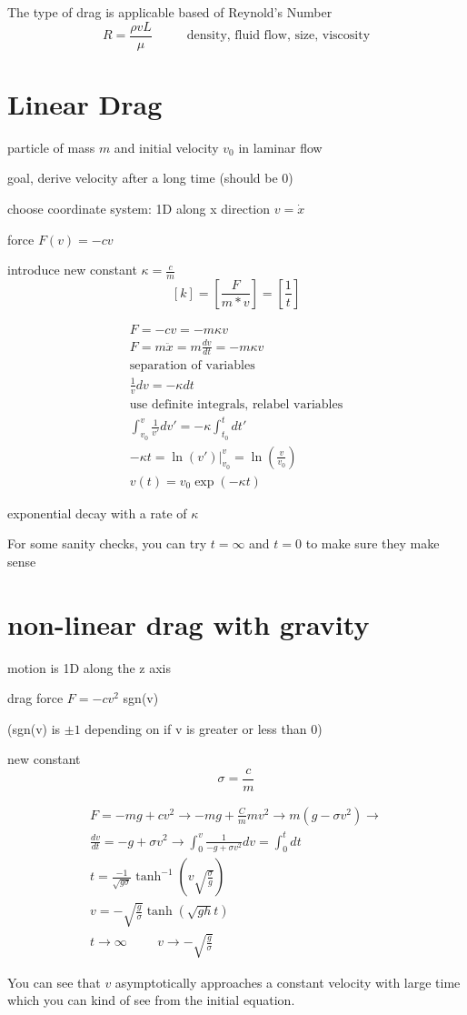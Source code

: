 \documentclass[fleqn]{report}
\newcommand{\hp}{\hspace{1cm}}
\newcommand{\equations} [1] {
\begin{gather*}
#1
\end{gather*}
}
\begin{document}
The type of drag is applicable based of Reynold's Number
\[
R = \frac{\rho v L}{\mu} \hp
\textrm{ density, fluid flow, size, viscosity}
\]

\section{Linear Drag}
particle of mass $m$ and initial velocity $v_0$ in laminar flow

goal, derive velocity after a long time (should be 0)

choose coordinate system: 1D along x direction $v = \dot x$

force $F(v) = -cv$

introduce new constant $\kappa  = \frac{c}{m}$
\[
[k] = [\frac{F}{m * v}] = [\frac{1}{t}]
\]

\equations{
    F = -cv = -m \kappa v
    \\
    F = m \ddot x = m \frac{dv}{dt} = -m \kappa v
    \\
    \textrm{separation of variables}
    \\
    \frac{1}{v} dv = - \kappa dt 
    \\
    \textrm{use definite integrals, relabel variables}
    \\
    \int^v_{v_0} \frac{1}{v'} dv' = - \kappa \int^t_{t_0} dt'
    \\
    - \kappa t = \ln(v') \Big |^v_{v_0} = \ln(\frac{v}{v_0})
    \\
    v(t) = v_0 \exp(- \kappa t)
}
exponential decay with a rate of $\kappa$

For some sanity checks, you can try $t = \infty$ and $t = 0$ to 
make sure they make sense

\section{non-linear drag with gravity}
motion is 1D along the z axis 

drag force $F = -c v^2$ sgn(v)

(sgn(v) is $\pm 1$ depending on if v is greater or less than 0)

new constant 
\[
\sigma = \frac{c}{m}
\]

\equations{
    F = -mg + cv^2
    \rightarrow
    -mg + \frac{C}{m}mv^2 \rightarrow
    m(g - \sigma v^2)
    \rightarrow
    \\
    \frac{dv}{dt} = -g + \sigma v^2
    \rightarrow
    \int^v_0 \frac{1}{-g + \sigma v^2} dv = \int^t_0 dt
    \\
    t = \frac{-1}{\sqrt{g \sigma}}
    \tanh^{-1}(v \sqrt{\frac{\sigma}{g}})
    \\
    v = - \sqrt{\frac{g}{\sigma}} \tanh(\sqrt{gh} t)
    \\
    t \to \infty \hp v \to - \sqrt{\frac{g}{\sigma}}
}
You can see that $v$ asymptotically approaches a constant
velocity with large time which you can kind of see 
from the initial equation.
\end{document}
